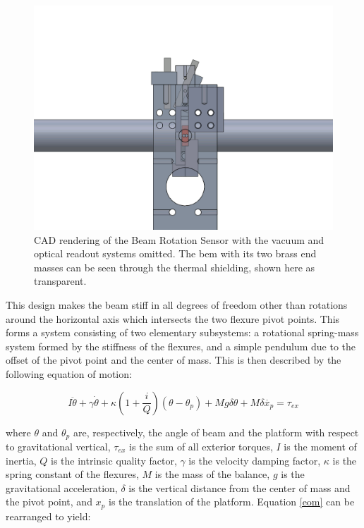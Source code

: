 \documentclass [12pt, proquest]{uwthesis}[2019]
\begin{document}
\begin{figure}
\begin{center} 
\includegraphics[width=\textwidth]{BRSFrontDetail.png}
\end{center}
\caption{CAD rendering of the Beam Rotation Sensor with the vacuum and optical readout systems omitted. The bem with its two brass end masses can be seen through the thermal shielding, shown here as transparent. }
\end{figure}


This design makes the beam stiff in all degrees of freedom other than rotations around the horizontal axis which intersects the two flexure pivot points. This forms a system consisting of two elementary subsystems: a rotational spring-mass system formed by the stiffness of the flexures, and a simple pendulum due to the offset of the pivot point and the center of mass. This is then described by the following equation of motion: \cite{venk2014}

\begin{equation}
I \ddot{\theta}+ \gamma \dot{\theta}+\kappa (1+ \frac{i}{Q})(\theta-\theta_p)+M g \delta \theta +M \delta \ddot{x_p}=\tau_{ex} \label{eom}
\end{equation}

where $\theta$ and $\theta_p$ are, respectively, the angle of beam and the platform with respect to gravitational vertical, $\tau_{ex}$ is the sum of all exterior torques, $I$ is the moment of inertia, $Q$ is the intrinsic quality factor, $\gamma$ is the velocity damping factor, $\kappa$ is the spring constant of the flexures, $M$ is the mass of the balance, $g$ is the gravitational acceleration, $\delta$ is the vertical distance from the center of mass and the pivot point, and $x_p$ is the translation of the platform. Equation \ref{eom} can be rearranged to yield:
\end{document}
